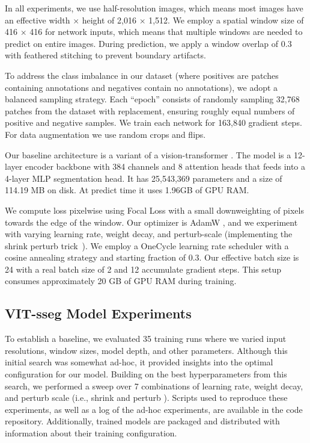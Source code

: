 In all experiments, we use half-resolution images, which means most images have an effective width $\times$
  height of 2,016 $\times$ 1,512.
We employ a spatial window size of 416 $\times$ 416 for network inputs, which means that multiple windows
  are needed to predict on entire images.
During prediction, we apply a window overlap of 0.3 with feathered stitching to prevent boundary artifacts.

To address the class imbalance in our dataset (where positives are patches containing annotations and
  negatives contain no annotations), we adopt a balanced sampling strategy.
Each ``epoch'' consists of randomly sampling 32,768 patches from the dataset with replacement, ensuring
  roughly equal numbers of positive and negative samples.
We train each network for 163,840 gradient steps.
For data augmentation we use random crops and flips.

Our baseline architecture is a variant \cite{bertasius2021space,Greenwell_2024_WACV} of a vision-transformer
  \cite{dosovitskiy_image_2021}.
The model is a 12-layer encoder backbone with 384 channels and 8 attention heads that feeds into a 4-layer
  MLP segmentation head.
It has 25,543,369 parameters and a size of 114.19 MB on disk.
At predict time it uses 1.96GB of GPU RAM.

We compute loss pixelwise using Focal Loss \cite{ross2017focal} with a small downweighting of pixels towards
  the edge of the window.
Our optimizer is AdamW \cite{loshchilov_decoupled_2018}, and we experiment with varying learning rate,
  weight decay, and perturb-scale (implementing the shrink perturb trick~\cite{ash_warm_starting_2020,dohare_loss_2023}).
We employ a OneCycle learning rate scheduler \cite{smith2019super} with a cosine annealing strategy and
  starting fraction of 0.3.
Our effective batch size is 24 with a real batch size of 2 and 12 accumulate gradient steps.
This setup consumes approximately 20 GB of GPU RAM during training.

\subsection{VIT-sseg Model Experiments}

To establish a baseline, we evaluated 35 training runs where we varied input resolutions, window sizes,
  model depth, and other parameters.
Although this initial search was somewhat ad-hoc, it provided insights into the optimal configuration for
  our model.
Building on the best hyperparameters from this search, we performed a sweep over 7 combinations of learning
  rate, weight decay, and perturb scale (i.e., shrink and perturb
  \cite{ash_warm_starting_2020,dohare_loss_2023}).
Scripts used to reproduce these experiments, as well as a log of the ad-hoc experiments, are available in
  the code repository.
Additionally, trained models are packaged and distributed with information about their training
  configuration.

